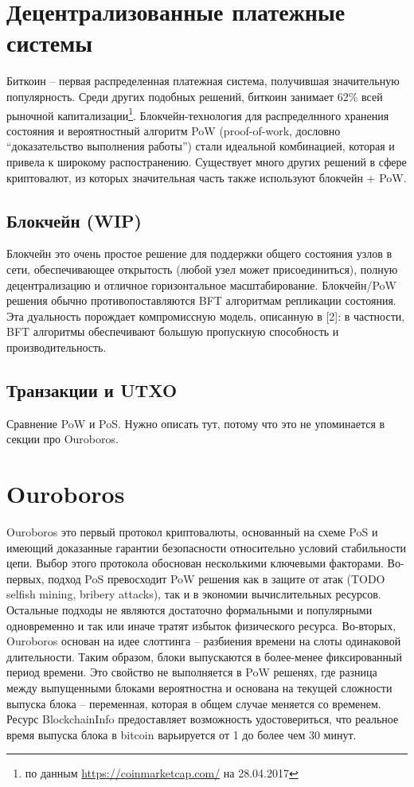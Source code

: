 \documentclass[]{itmo-student-thesis}
\begin{document}
\section{Децентрализованные платежные системы}

Биткоин -- первая распределенная платежная система, получившая
значительную популярность. Среди других подобных решений, биткоин
занимает 62\% всей рыночной капитализации\footnote{по данным
  \url{https://coinmarketcap.com/} на 28.04.2017}. Блокчейн-технология
для распределнного хранения состояния и вероятностный алгоритм PoW
(proof-of-work, дословно ``доказательство выполнения работы'') стали
идеальной комбинацией, которая и привела к широкому
распостранению. Существует много других решений в сфере криптовалют,
из которых значительная часть также используют блокчейн + PoW.

\subsection{Блокчейн (WIP)}

Блокчейн это очень простое решение для поддержки общего состояния
узлов в сети, обеспечивающее открытость (любой узел может
присоединиться), полную децентрализацию и отличное горизонтальное
масштабирование. Блокчейн/PoW решения обычно противопоставляются BFT
алгоритмам репликации состояния. Эта дуальность порождает
компромиссную модель, описанную в [2]: в частности, BFT алгоритмы
обеспечивают большую пропускную способность и производительность.

\subsection{Транзакции и UTXO}

Сравнение PoW и PoS. Нужно описать тут, потому что это не упоминается
в секции про Ouroboros.

\section{Ouroboros}

Ouroboros это первый протокол криптовалюты, основанный на схеме PoS и
имеющий доказанные гарантии безопасности относительно условий
стабильности цепи. Выбор этого протокола обоснован несколькими
ключевыми факторами. Во-первых, подход PoS превосходит PoW решения как
в защите от атак (TODO selfish mining, bribery attacks), так и в
экономии вычислительных ресурсов. Остальные подходы не являются
достаточно формальными и популярными одновременно и так или иначе
тратят избыток физического ресурса. Во-вторых, Ouroboros основан на
идее слоттинга -- разбиения времени на слоты одинаковой
длительности. Таким образом, блоки выпускаются в более-менее
фиксированный период времени. Это свойство не выполняется в PoW
решенях, где разница между выпущенными блоками вероятностна и основана
на текущей сложности выпуска блока -- переменная, которая в общем
случае меняется со временем. Ресурс BlockchainInfo предоставляет
возможность удостовериться, что реальное время выпуска блока в bitcoin
варьируется от 1 до более чем 30 минут.
\end{document}
